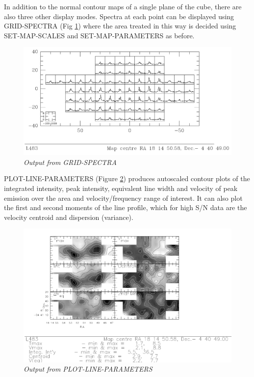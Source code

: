\documentclass[11pt,twoside]{report}
\begin{document}
In addition to the normal contour maps of a single plane of the cube, there are
also three other display modes. Spectra at each point can be displayed using
GRID-SPECTRA (Fig \ref{GRID}) where the area treated in this way is decided
using SET-MAP-SCALES and SET-MAP-PARAMETERS as before.
\begin{figure}[htbp]
\begin{center}
\includegraphics[scale=0.65]{grid-spec}
\protect\parbox{5.5in}
{\caption[GRID]
{\sl
Output from GRID-SPECTRA
\label{GRID}
}
}
\end{center}
\end{figure}

PLOT-LINE-PARAMETERS (Figure \ref{PLP}) produces autoscaled contour plots of
the integrated intensity, peak intensity, equivalent line width and velocity of
peak emission over the area and velocity/frequency range of interest. It can
also plot the first and second moments of the line profile, which for high
S/N data are the velocity centroid and dispersion (variance).
\begin{figure}[htbp]
\begin{center}
\includegraphics[scale=0.8]{plot-l-p}
\protect\parbox{5.5in}
{\caption[PLP]
{\sl
Output from PLOT-LINE-PARAMETERS
\label{PLP}
}
}
\end{center}
\end{figure}
\end{document}
